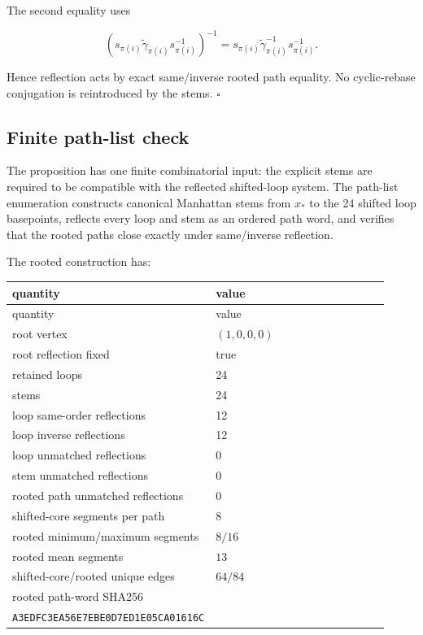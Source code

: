 \documentclass[10pt]{article}
\begin{document}
The second equality uses

\[
(s_{\pi(i)}\widetilde\gamma_{\pi(i)}s_{\pi(i)}^{-1})^{-1}
=
s_{\pi(i)}\widetilde\gamma_{\pi(i)}^{-1}s_{\pi(i)}^{-1}.
\]

Hence reflection acts by exact same/inverse rooted path equality.  No cyclic-rebase conjugation is reintroduced by the stems.  \(\square\)

\subsection{Finite path-list check}

The proposition has one finite combinatorial input: the explicit stems are required to be compatible with the reflected shifted-loop system.  The path-list enumeration constructs canonical Manhattan stems from \(x_\ast\) to the 24 shifted loop basepoints, reflects every loop and stem as an ordered path word, and verifies that the rooted paths close exactly under same/inverse reflection.

The rooted construction has:

\begin{center}
\small
\begin{longtable}{|p{0.46\linewidth}|p{0.46\linewidth}|}
\hline
quantity & value \\
\hline
\endfirsthead
\hline
quantity & value \\
\hline
\endhead
root vertex & \((1,0,0,0)\) \\
\hline
root reflection fixed & true \\
\hline
retained loops & 24 \\
\hline
stems & 24 \\
\hline
loop same-order reflections & 12 \\
\hline
loop inverse reflections & 12 \\
\hline
loop unmatched reflections & 0 \\
\hline
stem unmatched reflections & 0 \\
\hline
rooted path unmatched reflections & 0 \\
\hline
shifted-core segments per path & 8 \\
\hline
rooted minimum/maximum segments & \(8/16\) \\
\hline
rooted mean segments & \(13\) \\
\hline
shifted-core/rooted unique edges & \(64/84\) \\
\hline
rooted path-word SHA256 &
\begin{tabular}[t]{@{}l@{}}
\texttt{\scriptsize 1EB6E829D66DCDFA6E12E18CACA3C09}\\
\texttt{\scriptsize A3EDFC3EA56E7EBE0D7ED1E05CA01616C}
\end{tabular}
\\
\hline
\end{longtable}
\end{center}
\end{document}
